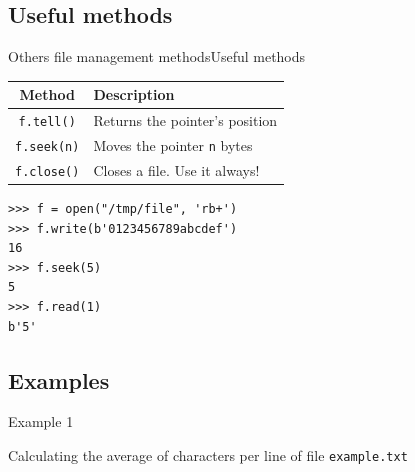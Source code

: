 \documentclass[10pt,compress]{beamer} %
\begin{document}
\subsection{Useful methods}
\begin{frame}[fragile]{Others file management methods}{Useful methods}

	\begin{tabular}{c|l}\hline
  	\sc Method & \sc Description  \\\hline
  	\texttt{f.tell()} & Returns the pointer's position \\
  	\texttt{f.seek(n)} & Moves the pointer \texttt{n} bytes \\
  	\texttt{f.close()} & Closes a file. Use it always! \\\hline
  	\end{tabular}

\begin{verbatim}
>>> f = open("/tmp/file", 'rb+')
>>> f.write(b'0123456789abcdef')
16
>>> f.seek(5)
5
>>> f.read(1)
b'5'
\end{verbatim}
\end{frame}

\subsection{Examples}
\begin{frame}[fragile]{Example 1}{}
	\begin{block}{Calculating the average of characters per line of file \texttt{example.txt}}
	\vspace{-0.2cm}
	
	\vspace{-0.2cm}
	\end{block}
\end{frame}
\end{document}
